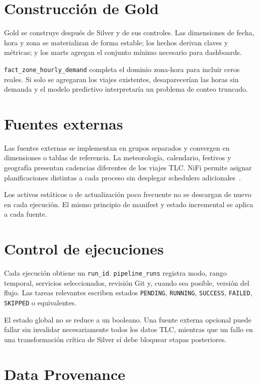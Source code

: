 \section{Construcción de Gold}

Gold se construye después de Silver y de sus controles. Las dimensiones de fecha, hora y zona se materializan de forma estable; los hechos derivan claves y métricas; y los marts agregan el conjunto mínimo necesario para dashboards.

\texttt{fact\_zone\_hourly\_demand} completa el dominio zona-hora para incluir ceros reales. Si solo se agregaran los viajes existentes, desaparecerían las horas sin demanda y el modelo predictivo interpretaría un problema de conteo truncado.

\section{Fuentes externas}

Las fuentes externas se implementan en grupos separados y convergen en dimensiones o tablas de referencia. La meteorología, calendario, festivos y geografía presentan cadencias diferentes de los viajes TLC\@. NiFi permite asignar planificaciones distintas a cada proceso sin desplegar schedulers adicionales~\cite{nifi_user_guide}.

Los activos estáticos o de actualización poco frecuente no se descargan de nuevo en cada ejecución. El mismo principio de manifest y estado incremental se aplica a cada fuente.

\section{Control de ejecuciones}

Cada ejecución obtiene un \texttt{run\_id}. \texttt{pipeline\_runs} registra modo, rango temporal, servicios seleccionados, revisión Git y, cuando sea posible, versión del flujo. Las tareas relevantes escriben estados \texttt{PENDING}, \texttt{RUNNING}, \texttt{SUCCESS}, \texttt{FAILED}, \texttt{SKIPPED} o equivalentes.

El estado global no se reduce a un booleano. Una fuente externa opcional puede fallar sin invalidar necesariamente todos los datos TLC, mientras que un fallo en una transformación crítica de Silver sí debe bloquear etapas posteriores.

\section{Data Provenance}

